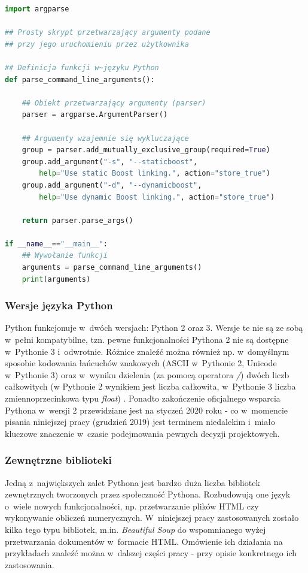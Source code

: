 \begin{lstlisting}[language=python,caption={Przykład prostego skryptu napisanego w~języku Python 3 - przetwarzanie argumentów podanych przez użytkownika do skryptu}, label={lst:pyexample}]
import argparse

## Prosty skrypt przetwarzający argumenty podane 
## przy jego uruchomieniu przez użytkownika

## Definicja funkcji w~języku Python
def parse_command_line_arguments():

    ## Obiekt przetwarzający argumenty (parser)
    parser = argparse.ArgumentParser()

    ## Argumenty wzajemnie się wykluczające
    group = parser.add_mutually_exclusive_group(required=True)
    group.add_argument("-s", "--staticboost", 
        help="Use static Boost linking.", action="store_true")
    group.add_argument("-d", "--dynamicboost",
        help="Use dynamic Boost linking.", action="store_true")

    return parser.parse_args()

if __name__=="__main__":
    ## Wywołanie funkcji
    arguments = parse_command_line_arguments()
    print(arguments)


\end{lstlisting}

\subsubsection*{Wersje języka Python}
Python funkcjonuje w~dwóch wersjach: Python 2 oraz 3. Wersje te nie są ze sobą w~pełni kompatybilne, tzn. pewne funkcjonalności Pythona 2 nie są dostępne w~Pythonie 3 i~odwrotnie. Różnice znaleźć można również np. w~domyślnym sposobie kodowania łańcuchów znakowych (ASCII w~Pythonie 2, Unicode w~Pythonie 3) oraz w~wyniku dzielenia (za pomocą operatora \textit{/}) dwóch liczb całkowitych (w Pythonie 2 wynikiem jest liczba całkowita, w~Pythonie 3 liczba zmiennoprzecinkowa typu \textit{float}) \cite{Python2vs3}. Ponadto zakończenie oficjalnego wsparcia Pythona w~wersji 2 przewidziane jest na styczeń 2020 roku \cite{Python2Countdown} - co w~momencie pisania niniejszej pracy (grudzień 2019) jest terminem niedalekim i~miało kluczowe znaczenie w~czasie podejmowania pewnych decyzji projektowych.

\subsubsection*{Zewnętrzne biblioteki}
Jedną z~największych zalet Pythona jest bardzo duża liczba bibliotek zewnętrznych tworzonych przez społeczność Pythona. Rozbudowują one język o~wiele nowych funkcjonalności, np. przetwarzanie plików HTML czy wykonywanie obliczeń numerycznych. W~niniejszej pracy zastosowanych zostało kilka tego typu bibliotek, m.in. \textit{Beautiful Soup} do wspomnianego wyżej przetwarzania dokumentów w~formacie HTML. Omówienie ich działania na przykładach znaleźć można w~dalszej części pracy - przy opisie konkretnego ich zastosowania. 


